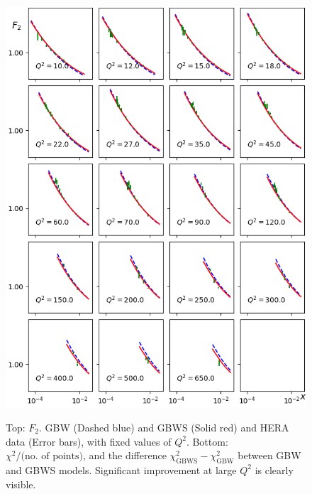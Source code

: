 \documentclass[11pt]{article}
\begin{document}
\begin{figure}[p]
{\includegraphics{./Plots/F2-data-GBW2.png}
}
\caption{Top: $F_2$. GBW (Dashed blue) and GBWS (Solid red) and HERA data (Error bars), with fixed values of $Q^2$. Bottom: $\chi^2/\text{(no. of points)}$, and the difference $\chi^2_{\mathrm{GBWS}}-\chi^2_{\mathrm{GBW}}$ between GBW and GBWS models. Significant improvement at large $Q^2$ is clearly visible.}
\label{fig:gridGBW}
\end{figure}
\end{document}
